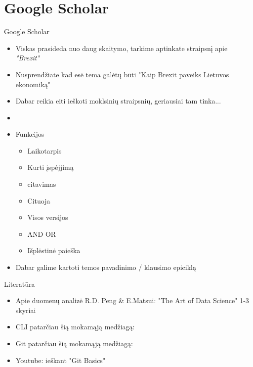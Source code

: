 \documentclass[11pt,xcolor=table]{beamer}
\begin{document}
\section{Google Scholar}
\begin{frame}{Google Scholar}
\begin{itemize}
\item Viskas prasideda nuo daug skaitymo, tarkime aptinkate  \href{https://www.economist.com/graphic-detail/2019/02/13/a-no-deal-brexit-would-affect-more-than-just-british-trade-with-the-eu}{\color{blue}{"The Economist"}} straipsnį apie \textit{"Brexit"}
\item Nusprendžiate kad esė tema galėtų būti "Kaip Brexit paveiks Lietuvos ekonomiką"
\item Dabar reikia eiti ieškoti moklsinių straipsnių, geriausiai tam tinka...
\item \href{https://scholar.google.lt/}{\color{blue}{https://scholar.google.lt/}}
\item Funkcijos
\begin{itemize}
\item Laikotarpis
\item Kurti įspėjjimą
\item citavimas
\item Cituoja
\item Visos versijos
\item AND OR 
\item Išplėstinė paieška
\end{itemize}
\item Dabar galime kartoti temos pavadinimo / klausimo epiciklą

\end{itemize}
\end{frame}
\begin{frame}{Literatūra}
\begin{itemize}
\item Apie duomenų analizė R.D. Peng \& E.Matsui: "The Art of Data Science" 1-3 skyriai
\item CLI patarčiau šią mokamąją medžiagą: \href{https://www.learnenough.com/command-line-tutorial/basics}{\color{blue}{Learn Enough Command Line to Be Dangerous}}
\item Git patarčiau šią mokamąją medžiagą: \href{https://www.learnenough.com/git-tutorial/getting_started}{\color{blue}{Learn Enough Git to Be Dangerous}}
\item Youtube: ieškant "Git Basics"
\end{itemize}
\end{frame}
\end{document}
